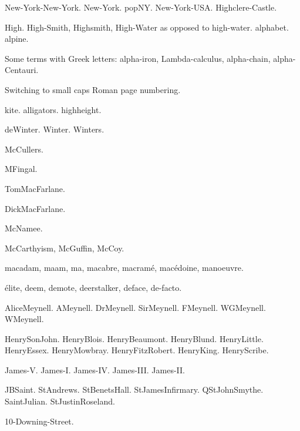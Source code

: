\documentclass{article}
\newcommand*{\myscroman}[1]{%
  \myscromannum{\value{#1}}%
}
\newcommand*{\myscromannum}[1]{%
  \textsc{\romannumeral#1}%
}
\begin{document}
\gls{New-York-New-York}. \gls{New-York}. 
\Gls{popNY}. \gls{New-York-USA}.
\gls{Highclere-Castle}.

\gls{High}. \gls{High-Smith}, \gls{Highsmith}, \gls{High-Water}
as opposed to \gls{high-water}. \Gls{alphabet}. \Gls{alpine}.

Some terms with Greek letters: \gls{alpha-iron}, 
\gls{Lambda-calculus}, \gls{alpha-chain}, \gls{alpha-Centauri}.

\newpage

\renewcommand{\thepage}{\myscroman{page}}%
Switching to small caps Roman page numbering.

\Gls{kite}. \Glspl{alligator}. \Gls{highheight}.

\gls{deWinter}.
\gls{Winter}.
\gls{Winters}.

\gls{McCullers}.

\gls{MFingal}.

\gls{TomMacFarlane}.

\gls{DickMacFarlane}.

\gls{McNamee}.

\gls{McCarthyism},
\gls{McGuffin},
\gls{McCoy}.

\Gls{macadam},
\gls{maam},
\gls{ma},
\gls{macabre},
\gls{macramé},
\gls{macédoine},
\gls{manoeuvre}.

\Gls{élite},
\gls{deem},
\gls{demote},
\gls{deerstalker},
\gls{deface},
\gls{de-facto}.


\gls{AliceMeynell}.
\gls{AMeynell}.
\gls{DrMeynell}.
\gls{SirMeynell}.
\gls{FMeynell}.
\gls{WGMeynell}.
\gls{WMeynell}.

\gls{HenrySonJohn}. \gls{HenryBlois}.
\gls{HenryBeaumont}. \gls{HenryBlund}.
\gls{HenryLittle}. \gls{HenryEssex}. \gls{HenryMowbray}.
\gls{HenryFitzRobert}.
\gls{HenryKing}. \gls{HenryScribe}.

\gls{James-V}.
\gls{James-I}.
\gls{James-IV}.
\gls{James-III}.
\gls{James-II}.

\gls{JBSaint}.
\gls{StAndrews}.
\gls{StBenetsHall}.
\gls{StJamesInfirmary}.
\gls{QStJohnSmythe}.
\gls{SaintJulian}.
\gls{StJustinRoseland}.

\gls{10-Downing-Street}.

\newpage

\renewcommand{\glsxtrbookindexcols}{3}

\renewcommand*{\glsxtrbookindexprelocation}[1]{%
  \glsxtrifhasfield{location}{#1}%
  {\dotfill}%
  {\glsxtrprelocation}%
}

\printunsrtglossary
 [
   title={Index},
   preamble={Locations in bold indicate primary reference.
   (Word sort.)}
 ]
\end{document}
